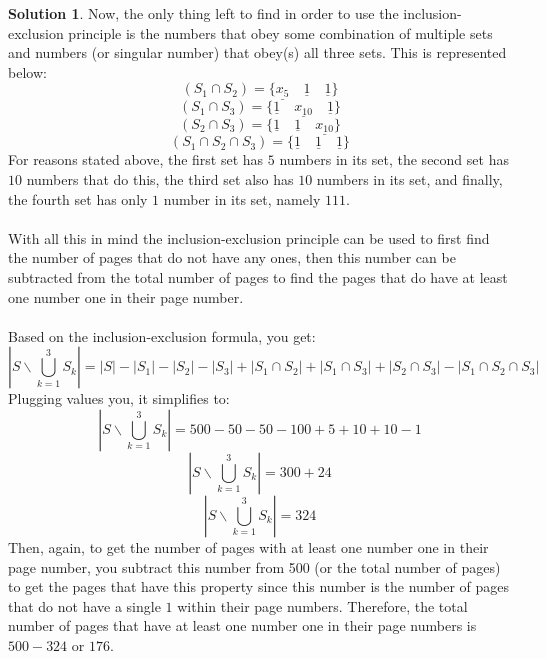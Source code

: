 \documentclass{article}
\theoremstyle{definition}
\newtheorem*{solution}{Solution}
\begin{document}
\begin{solution}
Now, the only thing left to find in order to use the inclusion-exclusion principle is the numbers that obey some combination of multiple sets and numbers (or singular number) that obey(s) all three sets. This is represented below:
$$ (S_1 \cap S_2) = \{ \underline{x_5} \quad \underline{1} \quad \underline{1}\} $$
$$ (S_1 \cap S_3) = \{\underline{1} \quad \underline{x_{10}} \quad \underline{1}\} $$
$$ (S_2 \cap S_3) = \{\underline{1} \quad \underline{1} \quad \underline{x_{10}}\} $$
$$ (S_1 \cap S_2 \cap S_3) = \{ \underline{1} \quad \underline{1} \quad \underline{1}\} $$
For reasons stated above, the first set has $5$ numbers in its set, the second set has $10$ numbers that do this, the third set also has $10$ numbers in its set, and finally, the fourth set has only $1$ number in its set, namely $111$.\\\\
With all this in mind the inclusion-exclusion principle can be used to first find the number of pages that do not have any ones, then this number can be subtracted from the total number of pages to find the pages that do have at least one number one in their page number.\\\\
Based on the inclusion-exclusion formula, you get:
$$ |S\backslash \bigcup_{k=1}^{3} S_k| = |S| - |S_1| - |S_2| - |S_3| + |S_1 \cap S_2| + |S_1 \cap S_3| + |S_2 \cap S_3| - |S_1 \cap S_2 \cap S_3| $$
Plugging values you, it simplifies to:
$$ |S\backslash \bigcup_{k=1}^{3} S_k| = 500 - 50 - 50 - 100 + 5 + 10 + 10 - 1 $$
$$ |S\backslash \bigcup_{k=1}^{3} S_k| = 300 + 24 $$
$$ |S\backslash \bigcup_{k=1}^{3} S_k| = 324 $$
Then, again, to get the number of pages with at least one number one in their page number, you subtract this number from 500 (or the total number of pages) to get the pages that have this property since this number is the number of pages that do not have a single $1$ within their page numbers. Therefore, the total number of pages that have at least one number one in their page numbers is $500-324$ or $176$.
\end{solution}
\end{document}
